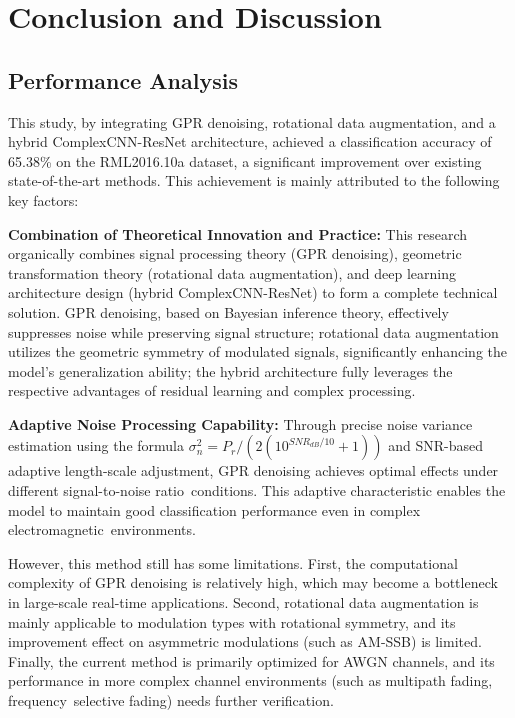 \documentclass[conference]{IEEEtran}
\begin{document}
\section{Conclusion and Discussion}

\subsection{Performance Analysis}

This study, by integrating GPR denoising, rotational data augmentation, and a hybrid ComplexCNN-ResNet architecture, achieved a classification accuracy of 65.38\% on the RML2016.10a dataset, a significant improvement over existing state-of-the-art methods. This achievement is mainly attributed to the following key factors:

\textbf{Combination of Theoretical Innovation and Practice:} This research organically combines signal processing theory (GPR denoising), geometric transformation theory (rotational data augmentation), and deep learning architecture design (hybrid ComplexCNN-ResNet) to form a complete technical solution. GPR denoising, based on Bayesian inference theory, effectively suppresses noise while preserving signal structure; rotational data augmentation utilizes the geometric symmetry of modulated signals, significantly enhancing the model's generalization ability; the hybrid architecture fully leverages the respective advantages of residual learning and complex processing.

\textbf{Adaptive Noise Processing Capability:} Through precise noise variance estimation using the formula $\sigma_n^2 = P_r/(2(10^{SNR_{dB}/10} + 1))$ and SNR-based adaptive length-scale adjustment, GPR denoising achieves optimal effects under different signal-to-noise ratio~conditions. This adaptive characteristic enables the model to maintain good classification performance even in complex electromagnetic~environments.

However, this method still has some limitations. First, the computational complexity of GPR denoising is relatively high, which may become a bottleneck in large-scale real-time applications. Second, rotational data augmentation is mainly applicable to modulation types with rotational symmetry, and its improvement effect on asymmetric modulations (such as AM-SSB) is limited. Finally, the current method is primarily optimized for AWGN channels, and its performance in more complex channel environments (such as multipath fading, frequency~selective fading) needs further verification.
\end{document}
